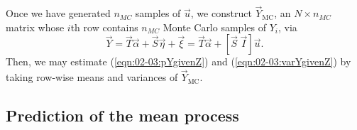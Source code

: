 \documentclass[12pt,a4paper]{article}
\begin{document}
\begin{appendices}
%
Once we have generated $n_{MC}$ samples of $\vec{u}$, we construct $\vec{Y}_{\text{MC}}$, an $N \times n_{MC}$ matrix whose $i$th row contains $n_{MC}$ Monte Carlo samples of $Y_i$, via 
\[
\vec{Y} 
= \vec{T}\vec{\alpha} + \vec{S}\vec{\eta} + \vec{\xi}
= \vec{T}\vec{\alpha} + 
[\vec{S} \; \vec{I}]
\vec{u}
.
\]
Then, we may estimate (\ref{eqn:02-03:pYgivenZ}) and (\ref{eqn:02-03:varYgivenZ}) by taking row-wise means and variances of $\vec{Y}_{\text{MC}}$. 






\subsection{Prediction of the mean process}\label{sec:prediction_mean_process}



\end{appendices}
\end{document}
